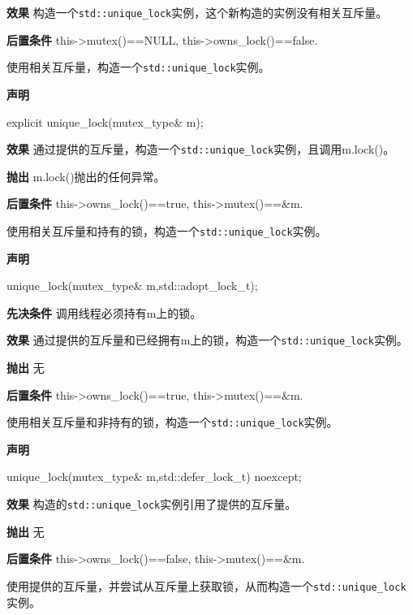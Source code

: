 \textbf{效果}
构造一个\texttt{std::unique\_lock}实例，这个新构造的实例没有相关互斥量。

\textbf{后置条件}
this->mutex()==NULL, this->owns\_lock()==false.


使用相关互斥量，构造一个\texttt{std::unique\_lock}实例。

\textbf{声明}

\begin{cpp}
explicit unique_lock(mutex_type& m);
\end{cpp}

\textbf{效果}
通过提供的互斥量，构造一个\texttt{std::unique\_lock}实例，且调用m.lock()。

\textbf{抛出}
m.lock()抛出的任何异常。

\textbf{后置条件}
this->owns\_lock()==true, this->mutex()==\&m.


使用相关互斥量和持有的锁，构造一个\texttt{std::unique\_lock}实例。

\textbf{声明}

\begin{cpp}
unique_lock(mutex_type& m,std::adopt_lock_t);
\end{cpp}

\textbf{先决条件}
调用线程必须持有m上的锁。

\textbf{效果}
通过提供的互斥量和已经拥有m上的锁，构造一个\texttt{std::unique\_lock}实例。

\textbf{抛出}
无

\textbf{后置条件}
this->owns\_lock()==true, this->mutex()==\&m.


使用相关互斥量和非持有的锁，构造一个\texttt{std::unique\_lock}实例。

\textbf{声明}

\begin{cpp}
unique_lock(mutex_type& m,std::defer_lock_t) noexcept;
\end{cpp}

\textbf{效果}
构造的\texttt{std::unique\_lock}实例引用了提供的互斥量。

\textbf{抛出}
无

\textbf{后置条件}
this->owns\_lock()==false, this->mutex()==\&m.


使用提供的互斥量，并尝试从互斥量上获取锁，从而构造一个\texttt{std::unique\_lock}实例。

